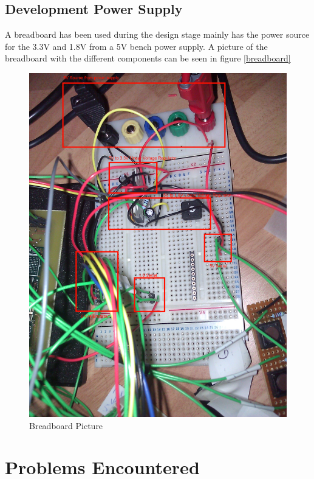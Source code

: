 \documentclass[11pt]{report} %
\begin{document}
	\subsection{Development Power Supply}
	A breadboard has been used during the design stage mainly has the power source
	for the 3.3V and 1.8V from a 5V bench power supply.
	A picture of the breadboard with the different components
	can be seen in figure \ref{breadboard}
	\begin{figure}[H]
		\centering
		\includegraphics[scale=0.34]{images/breadboard.png}
		\caption{Breadboard Picture}\label{fig:breadboard}
	\end{figure}
	
	\section{Problems Encountered}
\end{document}
